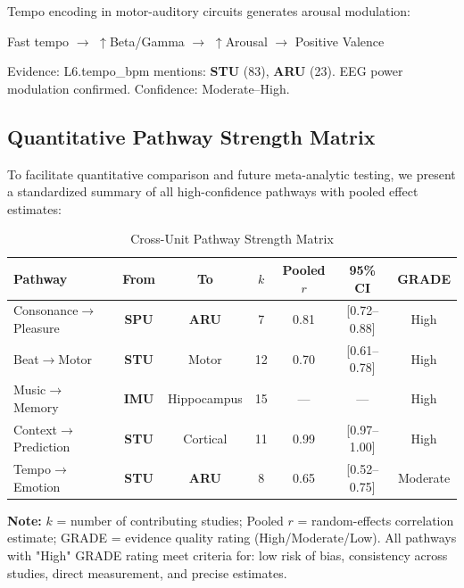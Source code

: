 \documentclass[9pt,onecolumn]{article}
\newcommand{\STU}{\textcolor{stucolor}{\textbf{STU}}}
\newcommand{\IMU}{\textcolor{imucolor}{\textbf{IMU}}}
\newcommand{\SPU}{\textcolor{spucolor}{\textbf{SPU}}}
\newcommand{\ARU}{\textcolor{arucolor}{\textbf{ARU}}}
\begin{document}
Tempo encoding in motor-auditory circuits generates arousal modulation:

\begin{center}
\small
Fast tempo $\rightarrow$ $\uparrow$Beta/Gamma $\rightarrow$ $\uparrow$Arousal $\rightarrow$ Positive Valence
\end{center}

Evidence: L6.tempo\_bpm mentions: \STU{} (83), \ARU{} (23). EEG power modulation confirmed. Confidence: Moderate--High.

\subsection{Quantitative Pathway Strength Matrix}

To facilitate quantitative comparison and future meta-analytic testing, we present a standardized summary of all high-confidence pathways with pooled effect estimates:

\begin{table}[H]
\centering
\caption{Cross-Unit Pathway Strength Matrix}
\label{tab:pathway-matrix}
\small
\begin{tabular}{@{}lcccccc@{}}
\toprule
\textbf{Pathway} & \textbf{From} & \textbf{To} & \textbf{$k$} & \textbf{Pooled $r$} & \textbf{95\% CI} & \textbf{GRADE} \\
\midrule
Consonance$\rightarrow$Pleasure & \SPU{} & \ARU{} & 7 & 0.81 & [0.72--0.88] & High \\
Beat$\rightarrow$Motor & \STU{} & Motor & 12 & 0.70 & [0.61--0.78] & High \\
Music$\rightarrow$Memory & \IMU{} & Hippocampus & 15 & --- & --- & High \\
Context$\rightarrow$Prediction & \STU{} & Cortical & 11 & 0.99 & [0.97--1.00] & High \\
Tempo$\rightarrow$Emotion & \STU{} & \ARU{} & 8 & 0.65 & [0.52--0.75] & Moderate \\
\bottomrule
\end{tabular}

\vspace{0.3em}
{\raggedright\footnotesize
\textbf{Note:} $k$ = number of contributing studies; Pooled $r$ = random-effects correlation estimate; GRADE = evidence quality rating (High/Moderate/Low). All pathways with "High" GRADE rating meet criteria for: low risk of bias, consistency across studies, direct measurement, and precise estimates.\par}
\end{table}
\end{document}
